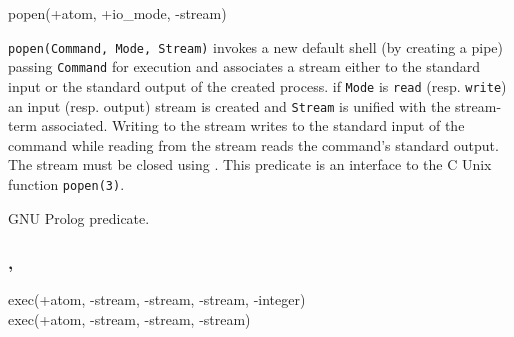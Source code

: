 \begin{TemplatesOneCol}
popen(+atom, +io\_mode, -stream)

\end{TemplatesOneCol}

\Description

\texttt{popen(Command, Mode, Stream)} invokes a new default shell (by
creating a pipe) passing \texttt{Command} for execution and associates a
stream either to the standard input or the standard output of the created
process. if \texttt{Mode} is \texttt{read} (resp. \texttt{write}) an input
(resp. output) stream is created and \texttt{Stream} is unified with the
stream-term associated. Writing to the stream writes to the standard input
of the command while reading from the stream reads the command's standard
output. The stream must be closed using  .
This predicate is an interface to the C Unix function \texttt{popen(3)}.

\begin{PlErrors}








\end{PlErrors}

\Portability

GNU Prolog predicate.

\subsubsection{,
               }

\begin{TemplatesOneCol}
exec(+atom, -stream, -stream, -stream, -integer)\\
exec(+atom, -stream, -stream, -stream)

\end{TemplatesOneCol}

